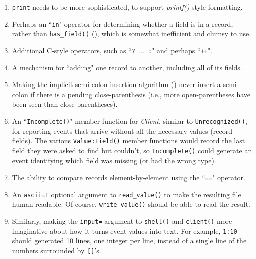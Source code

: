 \begin{enumerate}
\item {\tt print} needs to be more sophisticated, to support
{\em printf()\/}-style formatting.

\item Perhaps
an ``{\tt in}" operator for determining whether a
field is in a record, rather than {\tt has\_field()} (),
which is somewhat inefficient and clumsy to use.

\item Additional
C-style operators, such as ``{\tt ? $\ldots$ :}" and perhaps ``{\tt ++}".

\item A mechanism
for ``adding" one record to another, including all
of its fields.

\item Making the implicit semi-colon insertion algorithm ()
never insert a semi-colon if there is a pending close-parenthesis (i.e.,
more open-parentheses have been seen than close-parentheses).

\item An ``{\tt Incomplete()}" member function for {\em Client\/}, similar
to {\tt Unrecognized()}, for reporting events that arrive without all
the necessary values (record fields).  The various {\tt Value:Field()} member
functions would record the last field they were asked to find but couldn't,
so {\tt Incomplete()} could generate an event identifying which field
was missing (or had the wrong type).

\item The ability
to compare records element-by-element using the ``{\tt ==}"
operator.

\item An {\tt ascii=T} optional argument to {\tt read\_value()} to make
the resulting file human-readable.  Of course, {\tt write\_value()}
should be able to read the result.

\item Similarly, making the {\tt input=} argument to {\tt shell()} and
{\tt client()} more imaginative about how it turns event values into text.
For example, {\tt 1:10} should generated 10 lines, one integer per line,
instead of a single line of the numbers surrounded by {\tt []}'s.


\end{enumerate}
